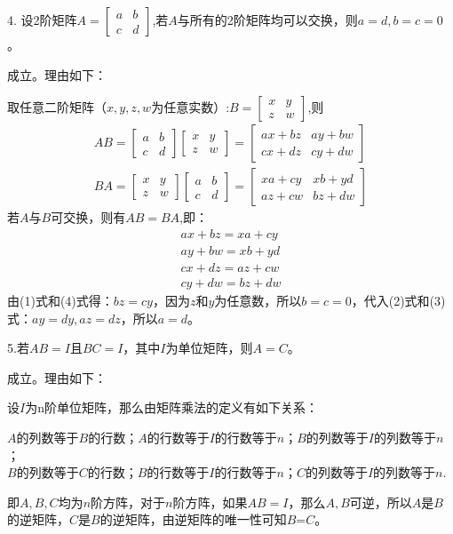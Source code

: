 \documentclass{article}
\begin{document}
4. 设2阶矩阵$A=
\begin{bmatrix}
  a & b \\
  c & d
\end{bmatrix}
$,若$A$与所有的2阶矩阵均可以交换，则$a=d,b=c=0$。

\begin{jie}
成立。理由如下：

取任意二阶矩阵（$x,y,z,w$为任意实数）:$
B=
\begin{bmatrix}
  x & y \\
  z & w
\end{bmatrix}
$,则
\begin{gather*}
AB=\begin{bmatrix}
  a & b \\
  c & d
\end{bmatrix}
\begin{bmatrix}
  x & y \\
  z & w
\end{bmatrix}=
\begin{bmatrix}
  ax+bz & ay+bw \\
  cx+dz & cy+dw
\end{bmatrix}\\
BA=
\begin{bmatrix}
  x & y \\
  z & w
\end{bmatrix}
\begin{bmatrix}
  a & b \\
  c & d
\end{bmatrix}=
\begin{bmatrix}
  xa+cy & xb+yd \\
  az+cw & bz+dw
\end{bmatrix}
\end{gather*}
若$A$与$B$可交换，则有$AB=BA$,即：
\begin{gather}
ax+bz=xa+cy  \\
ay+bw=xb+yd\\
cx+dz=az+cw\\
cy+dw=bz+dw
\end{gather}
由(1)式和(4)式得：$bz=cy$，因为$z$和$y$为任意数，所以$b=c=0$，代入(2)式和(3)式：$ay=dy,az=dz$，所以$a=d$。
\end{jie}

5.若$AB=I$且$BC=I$，其中$I$为单位矩阵，则$A=C$。

\begin{jie}
成立。理由如下：

设$I$为n阶单位矩阵，那么由矩阵乘法的定义有如下关系：

$A$的列数等于$B$的行数；$A$的行数等于$I$的行数等于$n$；$B$的列数等于$I$的列数等于$n$；\\
$B$的列数等于$C$的行数；$B$的行数等于$I$的行数等于$n$；$C$的列数等于$I$的列数等于$n$.

即$A,B,C$均为$n$阶方阵，对于$n$阶方阵，如果$AB=I$，那么$A,B$可逆，所以$A$是$B$的逆矩阵，$C$是$B$的逆矩阵，由逆矩阵的唯一性可知$B$=$C$。
\end{jie}
\end{document}
